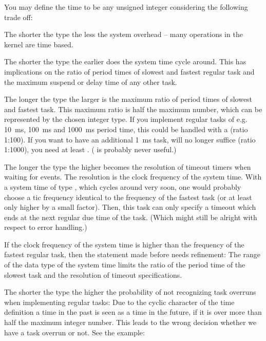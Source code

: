 You may define the time to be any unsigned integer considering the
following trade off:

The shorter the type the less the system overhead -- many operations in
the kernel are time based.

The shorter the type the earlier does the system time cycle around. This
has implications on the ratio of period times of slowest and fastest
regular task and the maximum suspend or delay time of any other task.

The longer the type the larger is the maximum ratio of period times of
slowest and fastest task. This maximum ratio is half the maximum number,
which can be represented by the chosen integer type. If you implement
regular tasks of e.g. 10~ms, 100~ms and 1000~ms period time, this could be
handled with a  (ratio 1:100). If you want to have an
additional 1~ms task,  will no longer suffice (ratio
1:1000), you need at least . ( is
probably never useful.)

The longer the type the higher becomes the resolution of timeout timers
when waiting for events. The resolution is the clock frequency of the
system time. With a system time of type , which cycles
around very soon, one would probably choose a tic frequency identical to
the frequency of the fastest task (or at least only higher by a small
factor). Then, this task can only specify a timeout which ends at the next
regular due time of the task. (Which might still be alright with respect
to error handling.)

If the clock frequency of the system time is higher than the frequency of
the fastest regular task, then the statement made before needs refinement:
The range of the data type of the system time limits the ratio of the period
time of the slowest task and the resolution of timeout specifications.

The shorter the type the higher the probability of not recognizing task
overruns when implementing regular tasks: Due to the cyclic character of
the time definition a time in the past is seen as a time in the future, if
it is over more than half the maximum integer number. This leads to the
wrong decision whether we have a task overrun or not. See the example:

